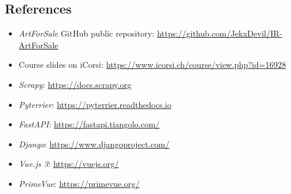 \documentclass[12pt]{spieman}  %
\begin{document}
\begin{spacing}{1}
    \section{References}\label{sec:references}
    \begin{itemize}
        \item \textit{ArtForSale} GitHub public repository: \url{https://github.com/JekxDevil/IR-ArtForSale}
        \item Course slides on iCorsi: \url{https://www.icorsi.ch/course/view.php?id=16928}
        \item \textit{Scrapy}: \url{https://docs.scrapy.org}
        \item \textit{Pyterrier}: \url{https://pyterrier.readthedocs.io}
        \item \textit{FastAPI}: \url{https://fastapi.tiangolo.com/}
        \item \textit{Django}: \url{https://www.djangoproject.com/}
        \item \textit{Vue.js 3}: \url{https://vuejs.org/}
        \item \textit{PrimeVue}: \url{https://primevue.org/}
    \end{itemize}

\end{spacing}
\end{document}

